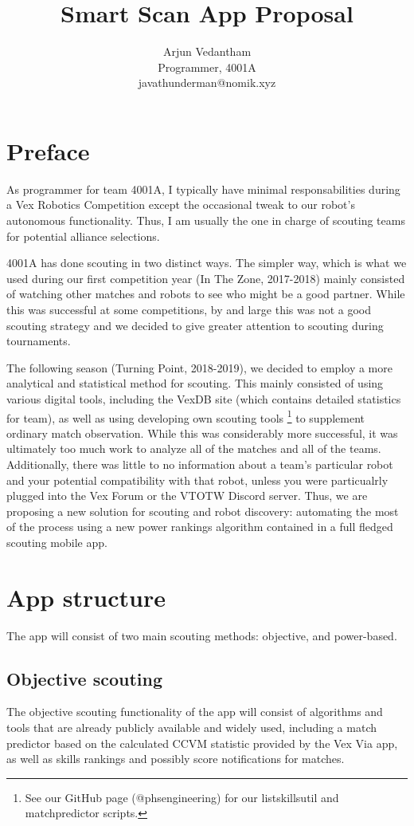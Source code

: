 \documentclass[11pt]{article}
\title{\textbf{Smart Scan App Proposal}}
\author{Arjun Vedantham\\ Programmer, 4001A\\javathunderman@nomik.xyz}
\date{}
\begin{document}
\maketitle

\section{Preface}

As programmer for team 4001A, I typically have minimal responsabilities during a Vex Robotics Competition except the occasional tweak to our robot's autonomous functionality. Thus, I am usually the one in charge of scouting teams for potential alliance selections. 

4001A has done scouting in two distinct ways. The simpler way, which is what we used during our first competition year (In The Zone, 2017-2018) mainly consisted of watching other matches and robots to see who might be a good partner. While this was successful at some competitions, by and large this was not a good scouting strategy and we decided to give greater attention to scouting during tournaments. 

The following season (Turning Point, 2018-2019), we decided to employ a more analytical and statistical method for scouting. This mainly consisted of using various digital tools, including the VexDB site (which contains detailed statistics for team), as well as using developing own scouting tools \footnote{See our GitHub page (@phsengineering) for our listskillsutil and matchpredictor scripts.} to supplement ordinary match observation. While this was considerably more successful, it was ultimately too much work to analyze all of the matches and all of the teams. Additionally, there was little to no information about a team's particular robot and your potential compatibility with that robot, unless you were particualrly plugged into the Vex Forum or the VTOTW Discord server. Thus, we are proposing a new solution for scouting and robot discovery: automating the most of the process using a new power rankings algorithm contained in a full fledged scouting mobile app. 

\section{App structure}
The app will consist of two main scouting methods: objective, and power-based. 
\subsection{Objective scouting}
The objective scouting functionality of the app will consist of algorithms and tools that are already publicly available and widely used, including a match predictor based on the calculated CCVM statistic provided by the Vex Via app, as well as skills rankings and possibly score notifications for matches. 
\end{document}
